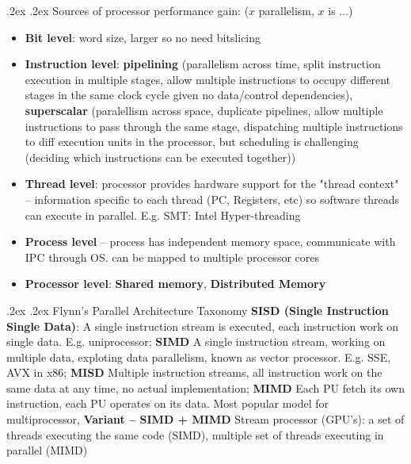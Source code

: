 \documentclass[10pt,landscape,a4paper]{article}
\makeatletter
\renewcommand{\subsection}{\@startsection{subsection}{1}{0mm}%
  {.2ex}%
  {.2ex}%
{\sffamily\bfseries}}
\makeatother
\begin{document}
\begin{multicols*}{4}
  \subsection{Sources of processor performance gain: ($x$ parallelism, $x$ is ...)}
  \begin{itemize}
    \item \textbf{Bit level}: word size, larger so no need bitslicing
    \item \textbf{Instruction level}: \textbf{pipelining} (parallelism across time, split instruction execution in multiple stages, allow multiple instructions to occupy different stages in the same clock cycle given no data/control dependencies), \textbf{superscalar} (paralellism across space, duplicate pipelines, allow multiple instructions to pass through the same stage, dispatching multiple instructions to diff execution units in the processor, but scheduling is challenging (deciding which instructions can be executed together))
    \item \textbf{Thread level}: processor provides hardware support for the "thread context" -- information specific to each thread (PC, Registers, etc) so software threads can execute in parallel. E.g. SMT: Intel Hyper-threading
    \item \textbf{Process level} -- process has independent memory space, communicate with IPC through OS. can be mapped to multiple processor cores
    \item \textbf{Processor level}: \textbf{Shared memory}, \textbf{Distributed Memory}
  \end{itemize}
  \subsection{Flynn's Parallel Architecture Taxonomy}
  \textbf{SISD (Single Instruction Single Data)}: A single instruction stream is executed, each instruction work on single data. E.g. uniprocessor; \textbf{SIMD}
  A single instruction stream, working on multiple data, exploting data parallelism, known as vector processor. E.g. SSE, AVX in x86; \textbf{MISD}
  Multiple instruction streams, all instruction work on the same data at any time, no actual implementation; \textbf{MIMD} Each PU fetch its own instruction, each PU operates on its data. Most popular model for multiprocessor, \textbf{Variant -- SIMD + MIMD}
  Stream processor (GPU's): a set of threads executing the same code (SIMD), multiple set of threads executing in parallel (MIMD)

\end{multicols*}
\end{document}

